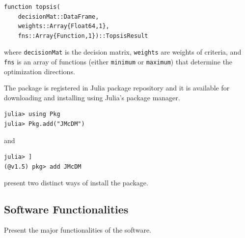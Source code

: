 \documentclass[authoryear,preprint,review,12pt]{elsarticle}
\begin{document}
\begin{verbatim}
function topsis(
    decisionMat::DataFrame, 
    weights::Array{Float64,1}, 
    fns::Array{Function,1})::TopsisResult
\end{verbatim} 

\noindent where \texttt{decisionMat} is the decision matrix, \texttt{weights} are weights of criteria, and \texttt{fns} is an array of functions (either \texttt{minimum} or \texttt{maximum}) that determine the optimization directions. 

The package is registered in Julia package repository and it is available for downloading and installing using Julia's package manager.  

\begin{verbatim}
julia> using Pkg
julia> Pkg.add("JMcDM")
\end{verbatim}

\noindent and 

\begin{verbatim}
julia> ]
(@v1.5) pkg> add JMcDM
\end{verbatim}

\noindent present two distinct ways of install the package.


\subsection{Software Functionalities}
\label{section:softwareFunc}
{\color{red}Present the major functionalities of the software.}
\end{document}
